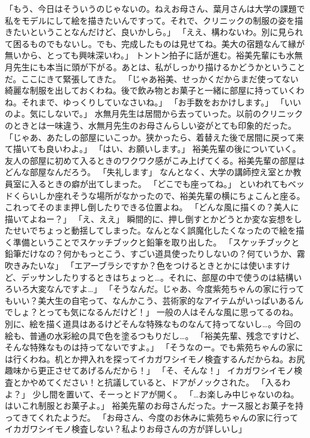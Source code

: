 「もう、今日はそういうのじゃないの。ねえお母さん、葉月さんは大学の課題で私をモデルにして絵を描きたいんですって。それで、クリニックの制服の姿を描きたいということなんだけど、良いかしら。」
「ええ、構わないわ。別に見られて困るものでもないし。でも、完成したものは見せてね。美大の宿題なんて縁が無いから、とっても興味深いわ。」
トントン拍子に話が進む。裕美先輩にも水無月先生にも本当に頭が下がる。あとは、私がしっかり描けるかどうかということだ。ここにきて緊張してきた。
「じゃあ裕美、せっかくだからまだ使ってない綺麗な制服を出しておくわね。後で飲み物とお菓子と一緒に部屋に持っていくわね。それまで、ゆっくりしていなさいね。」
「お手数をおかけします。」
「いいのよ。気にしないで。」
水無月先生は居間から去っていった。以前のクリニックのときとは一味違う、水無月先生のお母さんらしい姿がとても印象的だった。
「じゃあ、あたしの部屋にいこっか。狭かったら、着替えた後で居間に戻って来て描いても良いわよ。」
「はい、お願いします。」
裕美先輩の後についていく。友人の部屋に初めて入るときのワクワク感がこみ上げてくる。裕美先輩の部屋はどんな部屋なんだろう。
「失礼します」
なんとなく、大学の講師控え室とか教員室に入るときの癖が出てしまった。
「どこでも座ってね。」
といわれてもベッドくらいしか座れそうな場所がなかったので、裕美先輩の横にちょこんと座る。これってそのまま押し倒したりできる位置よね。
「どんな風に描くの？美人に描いてよねー？」
「え、ええ」
瞬間的に、押し倒すとかどうとか変な妄想をしたせいでちょっと動揺してしまった。なんとなく誤魔化したくなったので絵を描く準備ということでスケッチブックと鉛筆を取り出した。
「スケッチブックと鉛筆だけなの？何かもっとこう、すごい道具使ったりしないの？何ていうか、霧吹きみたいな」
「エアーブラシですか？色をつけるときとかには使いますけど、デッサンしたりするときはちょっと…。それに、部屋の中で使うのは結構いろいろ大変なんですよ…」
「そうなんだ。じゃあ、今度紫苑ちゃんの家に行ってもいい？美大生の自宅って、なんかこう、芸術家的なアイテムがいっぱいあるんでしょ？とっても気になるんだけど！」
一般の人はそんな風に思ってるのね。別に、絵を描く道具はあるけどそんな特殊なものなんて持ってないし…。今回の絵も、普通の水彩絵の具で色を塗るつもりだし…。
「裕美先輩、残念ですけど、そんな特殊なものは持ってないですよ。」
「そうなのー。でも紫苑ちゃんの家には行くわね。机とか押入れを探ってイカガワシイモノ検査するんだからね。お尻趣味から更正させてあげるんだから！」
「そ、そんな！」
イカガワシイモノ検査とかやめてください！と抗議していると、ドアがノックされた。
「入るわよ？」
少し間を置いて、そーっとドアが開く。
「…お楽しみ中じゃないのね。はいこれ制服とお菓子よ。」
裕美先輩のお母さんだった。ナース服とお菓子を持ってきてくれたようだ。
「お母さん、今度のお休みに紫苑ちゃんの家に行ってイカガワシイモノ検査しない？私よりお母さんの方が詳しいし」
